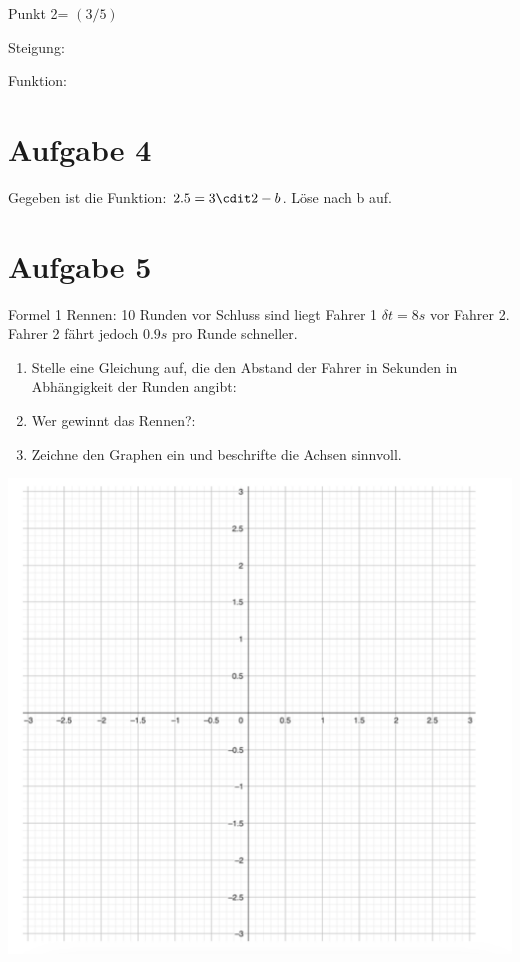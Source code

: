 \documentclass[
  letterpaper,
  DIV=11]{scrartcl}
\providecommand{\tightlist}{%
  \setlength{\itemsep}{0pt}\setlength{\parskip}{0pt}}\usepackage{longtable,booktabs,array}
\begin{document}
Punkt 2= \((3/5)\)

Steigung:

Funktion:

\section{Aufgabe 4}\label{aufgabe-4}

Gegeben ist die Funktion: \(2.5 = 3 \cdit 2-b\). Löse nach b auf.

\section{Aufgabe 5}\label{aufgabe-5}

Formel 1 Rennen: 10 Runden vor Schluss sind liegt Fahrer 1
\(\delta t = 8 s\) vor Fahrer 2. Fahrer 2 fährt jedoch \(0.9s\) pro
Runde schneller.

\begin{enumerate}
\def\labelenumi{\alph{enumi})}
\tightlist
\item
  Stelle eine Gleichung auf, die den Abstand der Fahrer in Sekunden in
  Abhängigkeit der Runden angibt:
\item
  Wer gewinnt das Rennen?:
\item
  Zeichne den Graphen ein und beschrifte die Achsen sinnvoll.
\end{enumerate}

\includegraphics{images/Screenshot 2024-06-13 at 13.36.05.png}
\end{document}
